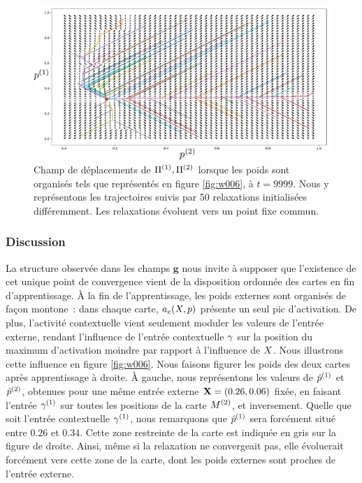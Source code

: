 \documentclass[../main]{subfiles}
\begin{document}
	
	\begin{figure}
	\centering
	\includegraphics[width=\textwidth]{champ_006.pdf}
	\caption{Champ de déplacements de $\Pi^{({1})},\Pi^{({2})}$ lorsque les poids sont organisés tels que représentés en figure \ref{fig:w006}, à $t=9999$. Nous y représentons les trajectoires suivis par 50 relaxations initialisées différemment. Les relaxations évoluent vers un point fixe commun.}
	\label{fig:champ_9999}
	\end{figure}

\subsubsection{Discussion}
La structure observée dans les champs $\mathbf{g}$ nous invite à supposer que l'existence de cet unique point de convergence vient de la disposition ordonnée des cartes en fin d'apprentissage. 
\`A la fin de l'apprentissage, les poids externes sont organisés de façon montone~: dans chaque carte, $a_e(X,p)$ présente un seul pic d'activation.
De plus, l'activité contextuelle vient seulement moduler les valeurs de l'entrée externe, rendant l'influence de l'entrée contextuelle $\gamma$ sur la position du maximum d'activation moindre par rapport à l'influence de $X$.
Nous illustrons cette influence en figure \ref{fig:w006}. 
Nous faisons figurer les poids des deux cartes après apprentissage à droite. 
\`A gauche, nous représentons les valeurs de $\hat{p}^{({1})}$ et $\hat{p}^{({2})}$, obtenues pour une même entrée externe $\mathbf{X} = (0.26, 0.06)$ fixée, en faisant l'entrée $\gamma^{({1})}$ sur toutes les positions de la carte $M^{({2})}$, et inversement.
Quelle que soit l'entrée contextuelle $\gamma^{({1})}$, nous remarquons que $\hat{p}^{({1})}$ sera forcément situé entre $0.26$ et $0.34$.
Cette zone restreinte de la carte est indiquée en gris sur la figure de droite.
Ainsi, même si la relaxation ne convergeait pas, elle évoluerait forcément vers cette zone de la carte, dont les poids externes sont proches de l'entrée externe.
\end{document}
